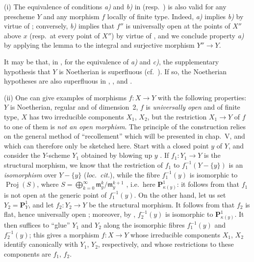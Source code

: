 \begin{remarks}[14.4.10]
\label{IV.14.4.10}
(i) The equivalence of conditions \emph{a)} and \emph{b)} in  (resp.\ ) is also valid for any prescheme $Y$ and any morphism $f$ locally of finite type.
Indeed, \emph{a)} implies \emph{b)} by virtue of ; conversely, \emph{b)} implies that $f''$ is universally open at the points of $X''$ above $x$ (resp.\ at every point of $X''$) by virtue of , and we conclude property \emph{a)} by applying the lemma  to the integral and surjective morphism $Y''\to Y$.

It may be that, in , for the equivalence of \emph{a)} and \emph{c)}, the supplementary hypothesis that $Y$ is Noetherian is superfluous (cf.\ ).
If so, the Noetherian hypotheses are also superfluous in , ,  and .

(ii) One can give examples of morphisms $f:X\to Y$ with the following properties: $Y$ is Noetherian, regular and of dimension~2, $f$ is \emph{universally open} and of finite type, $X$ has two irreducible components $X_1$, $X_2$, but the restriction $X_1\to Y$ of $f$ to one of them is \emph{not an open morphism}.
The principle of the construction relies on the general method of ``recollement'' which will be presented in chap.~V, and which can therefore only be sketched here.
Start with a closed point $y$ of $Y$, and consider the $Y$-scheme $Y_1$ obtained by blowing up $y$ . If $f_1:Y_1\to Y$ is the structural morphism, we know that the restriction of $f_1$ to $f_1^{-1}(Y-\{y\})$ is an \emph{isomorphism} over $Y-\{y\}$ (\emph{loc.\ cit.}), while the fibre $f_1^{-1}(y)$ is isomorphic to $\operatorname{Proj}(S)$, where $S=\bigoplus_{k=0}^{\infty}\mathfrak{m}_y^k/\mathfrak{m}_y^{k+1}$ , i.e.\ here $\mathbf{P}^1_{\kappa(y)}$: it follows from  that $f_1$ is not open at the generic point of $f_1^{-1}(y)$.
On the other hand, let us set $Y_2=\mathbf{P}^1_Y$, and let $f_2:Y_2\to Y$ be the structural morphism. It follows from  that $f_2$ is flat, hence universally open ; moreover, by , $f_2^{-1}(y)$ is isomorphic to $\mathbf{P}^1_{\kappa(y)}$. It then suffices to ``glue'' $Y_1$ and $Y_2$ along the isomorphic fibres $f_1^{-1}(y)$ and $f_2^{-1}(y)$; this gives a morphism $f:X\to Y$ whose irreducible components $X_1$, $X_2$ identify canonically with $Y_1$, $Y_2$, respectively, and whose restrictions to these components are $f_1$, $f_2$.


\end{remarks}
